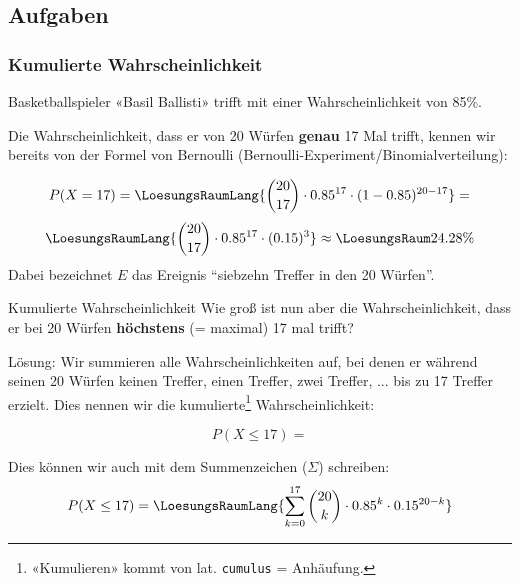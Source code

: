 \subsection*{Aufgaben}



\newpage
\subsubsection{Kumulierte Wahrscheinlichkeit}

Basketballspieler «Basil Ballisti» trifft mit einer
Wahrscheinlichkeit von 85\%.

Die Wahrscheinlichkeit, dass er von 20 Würfen \textbf{genau} 17 Mal trifft, kennen wir
bereits von der Formel von Bernoulli (Bernoulli-Experiment/Binomialverteilung):

$$P(X=17) = \LoesungsRaumLang{{20 \choose 17}\cdot 0.85^{17}\cdot(1-0.85)^{20-17}}=$$
$$\LoesungsRaumLang{{20 \choose 17}\cdot 0.85^{17}\cdot (0.15)^{3}}\approx{}\LoesungsRaum{24.28\%}$$
Dabei bezeichnet $E$ das Ereignis ``siebzehn Treffer in den 20 Würfen''.

\begin{beispiel}{Kumulierte Wahrscheinlichkeit}{}
Wie groß ist nun aber die Wahrscheinlichkeit, dass er bei 20 Würfen
\textbf{höchstens} (= maximal)  17 mal trifft?
\end{beispiel}


Lösung: Wir summieren alle Wahrscheinlichkeiten auf, bei denen er
während seinen 20 Würfen
keinen Treffer, einen Treffer, zwei Treffer, ... bis zu 17 Treffer
erzielt. Dies nennen wir die kumulierte\footnote{«Kumulieren» kommt von
  lat. \texttt{cumulus} = Anhäufung.} Wahrscheinlichkeit:

$$P(X\le 17) = $$

Dies können wir auch mit dem Summenzeichen ($\Sigma$) schreiben:
$$P(X\le 17) = \LoesungsRaumLang{\sum_{k=0}^{17} {20 \choose k} \cdot 0.85^k \cdot 0.15^{20-k}}$$

